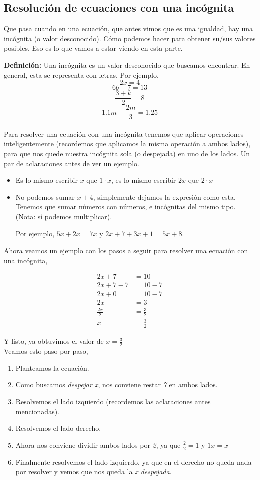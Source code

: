 \documentclass{article}
\begin{document}
\subsection{Resolución de ecuaciones con una incógnita}
\begin{normalsize}
Que pasa cuando en una ecuación, que antes vimos que es una igualdad, hay una incógnita (o valor desconocido). Cómo podemos hacer para obtener su/sus valores posibles. Eso es lo que vamos a estar viendo en esta parte.

\textbf{Definición:} Una incógnita es un valor desconocido que buscamos encontrar. En general, esta se representa con letras. Por ejemplo, 
\[2x=4\]
\[6b+7=13\]
\[\frac{3+k}{2}=8\]
\[1.1m-\frac{2m}{3}=1.25\]
\\
Para resolver una ecuación con una incógnita tenemos que aplicar operaciones inteligentemente (recordemos que aplicamos la misma operación a ambos lados), para que nos quede nuestra incógnita sola (o despejada) en uno de los lados.
Un par de aclaraciones antes de ver un ejemplo.
\begin{itemize}
	\item Es lo mismo escribir $x$ que $1\cdot x$, es lo mismo escribir $2x$ que $2\cdot x$
	\item No podemos sumar $x+4$, simplemente dejamos la expresión como esta. Tenemos que sumar números con números, e incógnitas del mismo tipo. (Nota: sí podemos multiplicar).
	
	Por ejemplo, $5x+2x=7x$ y $2x+7+3x+1=5x+8$.\\
\end{itemize}

Ahora veamos un ejemplo con los pasos a seguir para resolver una ecuación con una incógnita,

\begin{align}
2x+7 &= 10\\2x+7-7&=10-7\\2x+0&=10-7\\2x&=3\\\frac{2x}{2}&=\frac{3}{2}\\x&=\frac{3}{2}
\end{align}

Y listo, ya obtuvimos el valor de $x=\frac{3}{2}$\\

Veamos esto paso por paso,
\begin{enumerate}
	\item Planteamos la ecuación.
	\item Como buscamos \textit{despejar x}, nos conviene restar \textit{7} en ambos lados.
	\item Resolvemos el lado izquierdo (recordemos las aclaraciones antes mencionadas).
	\item Resolvemos el lado derecho.
	\item Ahora nos conviene dividir ambos lados por \textit{2}, ya que $\frac{2}{2}=1$ y $1x=x$
	\item Finalmente resolvemos el lado izquierdo, ya que en el derecho no queda nada por resolver y vemos que nos queda la \textit{x despejada}.
\end{enumerate}
\end{normalsize}
\end{document}
